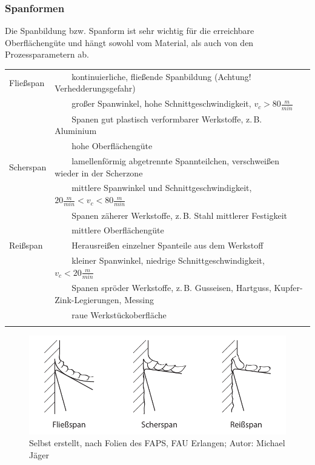 \documentclass{\basedir/fablab-document}
\newcommand{\tabitem}{~~\llap{\textbullet}~~}
\begin{document}
\subsubsection{Spanformen}
Die Spanbildung bzw. Spanform ist sehr wichtig für die erreichbare Oberflächengüte und hängt sowohl vom Material, als auch von den Prozessparametern ab. \\[1em]
\begin{tabular}{ll}
    Fließspan		& \tabitem kontinuierliche, fließende Spanbildung (Achtung! Verhedderungsgefahr)													\\ 
								&	\tabitem großer Spanwinkel, hohe Schnittgeschwindigkeit, $v_c > 80 \frac{m}{min} $											\\
								&	\tabitem Spanen gut plastisch verformbarer Werkstoffe, z.\,B. Aluminium																		\\
								&	\tabitem hohe Oberflächengüte																																						\\ \addlinespace
    Scherspan		& \tabitem lamellenförmig abgetrennte Spannteilchen, verschweißen wieder in der Scherzone									\\ 
								&	\tabitem mittlere Spanwinkel und Schnittgeschwindigkeit, $20 \frac{m}{min} < v_c < 80 \frac{m}{min} $		\\
								&	\tabitem Spanen zäherer Werkstoffe, z.\,B. Stahl mittlerer Festigkeit 																		\\
								&	\tabitem mittlere Oberflächengüte																																				\\ \addlinespace
    Reißspan		& \tabitem Herausreißen einzelner Spanteile aus dem Werkstoff																							\\ 
								&	\tabitem kleiner Spanwinkel, niedrige Schnittgeschwindigkeit, $v_c < 20 \frac{m}{min} $									\\
								&	\tabitem Spanen spröder Werkstoffe, z.\,B. Gusseisen, Hartguss, Kupfer-Zink-Legierungen, Messing					\\
								&	\tabitem raue Werkstückoberfläche																																				\\ \addlinespace
\end{tabular}
\begin{figure}[ht]
\centering
\includegraphics[width = \linewidth]{img/spanformen}
\caption{Selbst erstellt, nach Folien des FAPS, FAU Erlangen; Autor: Michael Jäger}
\end{figure}
\end{document}

